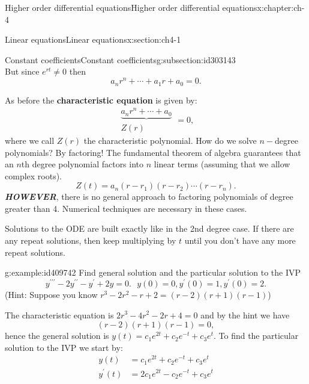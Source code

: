 \documentclass[oneside,10pt,]{book}
\newcommand{\alert}[1]{\textbf{\textit{#1}}}
\newcommand{\terminology}[1]{\textbf{#1}}
\numberwithin{equation}{section}
\numberwithin{equation}{section}
\newcommand{\amp}{&}
\begin{document}
\begin{chapterptx}{Higher order differential equations}{}{Higher order differential equations}{}{}{x:chapter:ch-4}
\begin{sectionptx}{Linear equations}{}{Linear equations}{}{}{x:section:ch4-1}
\begin{subsectionptx}{Constant coefficients}{}{Constant coefficients}{}{}{g:subsection:id303143}
\begin{equation*}
\end{equation*}
But since \(e^{rt}\neq0\) then%
\begin{equation*}
a_{n}r^{n}+\cdots+a_{1}r+a_{0}=0.
\end{equation*}
%
\par
As before the \terminology{characteristic equation} is given by:%
\begin{equation*}
\begin{array}{c}
\underbrace{a_{n}r^{n}+\cdots+a_{0}}\\
Z(r)
\end{array}=0,
\end{equation*}
where we call \(Z(r)\) the characteristic polynomial. How do we solve \(n-\)degree polynomials? By factoring! The fundamental theorem of algebra guarantees that an \(n\)th degree polynomial factors into \(n\) linear terms (assuming that we allow complex roots).%
\begin{equation*}
Z(t)=a_{n}\left(r-r_{1}\right)\left(r-r_{2}\right)\cdots\left(r-r_{n}\right).
\end{equation*}
\alert{HOWEVER}, there is no general approach to factoring polynomials of degree greater than 4. Numerical techniques are necessary in these cases.%
\par
Solutions to the ODE are built exactly like in the 2nd degree case. If there are any repeat solutions, then keep multiplying by \(t\) until you don't have any more repeat solutions.%
\begin{example}{}{g:example:id409742}%
Find general solution and the particular solution to the IVP%
\begin{equation*}
y^{\prime\prime\prime}-2y^{\prime\prime}-y^{\prime}+2y=0.\,\,\,\,y(0)=0,y^{\prime}(0)=1,y^{\prime}(0)=2.
\end{equation*}
(Hint: Suppose you know \(r^{3}-2r^{2}-r+2=\left(r-2\right)\left(r+1\right)\left(r-1\right)\))%
\par
The characteristic equation is \(2r^{3}-4r^{2}-2r+4=0\) and by the hint we have%
\begin{equation*}
\left(r-2\right)\left(r+1\right)\left(r-1\right)=0,
\end{equation*}
hence the general solution is \(y(t)=c_{1}e^{2t}+c_{2}e^{-t}+c_{3}e^{t}\). To find the particular solution to the IVP we start by:%
\begin{align*}
y(t) \amp =c_{1}e^{2t}+c_{2}e^{-t}+c_{3}e^{t}\\
y^{\prime}(t) \amp =2c_{1}e^{2t}-c_{2}e^{-t}+c_{3}e^{t}\\

\end{align*}
\end{example}
\end{subsectionptx}
\end{sectionptx}
\end{chapterptx}
\end{document}

